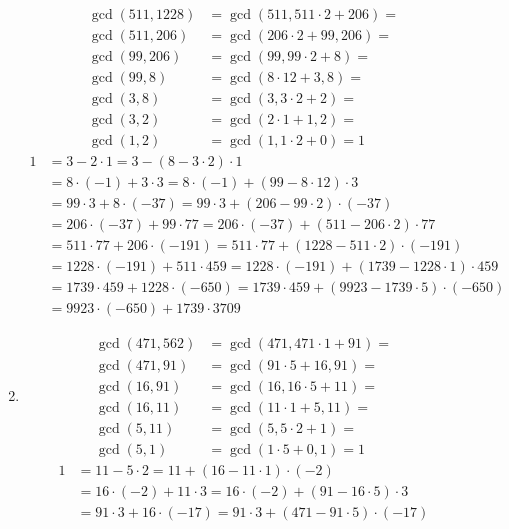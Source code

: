 \begin{description}
\begin{enumerate}
\begin{align*}
\gcd(511, 1228) &= \gcd(511, 511 \cdot 2 + 206) = \\
\gcd(511, 206) &= \gcd(206 \cdot 2 + 99, 206) = \\
\gcd(99, 206) &= \gcd(99, 99 \cdot 2 + 8) = \\
\gcd(99, 8) &= \gcd(8 \cdot 12 + 3, 8) = \\
\gcd(3, 8) &= \gcd(3, 3 \cdot 2 + 2) = \\
\gcd(3, 2) &= \gcd(2 \cdot 1 + 1, 2) = \\
\gcd(1, 2) &= \gcd(1, 1 \cdot 2 + 0) = 1
\end{align*}
\begin{align*}
1 &= 3 - 2 \cdot 1 = 3 - (8 - 3 \cdot 2) \cdot 1 \\
  &= 8 \cdot (-1) + 3 \cdot 3 = 8 \cdot (-1) + (99 - 8 \cdot 12) \cdot 3 \\
  &= 99 \cdot 3 + 8 \cdot (-37) = 99 \cdot 3 + (206 - 99 \cdot 2) \cdot (-37)\\
  &= 206 \cdot (-37) + 99 \cdot 77 = 206 \cdot (-37) + (511 - 206 \cdot 2)
     \cdot 77 \\
  &= 511 \cdot 77 + 206 \cdot (- 191) = 511 \cdot 77 + (1228 - 511 \cdot 2)
     \cdot (-191) \\
  &= 1228 \cdot (-191) + 511 \cdot 459 = 1228 \cdot (-191) +
     (1739 - 1228 \cdot 1) \cdot 459 \\
  &= 1739 \cdot 459 + 1228 \cdot (-650) = 1739 \cdot 459 +
     (9923 - 1739 \cdot 5) \cdot (-650) \\
  &= 9923 \cdot (-650) + 1739 \cdot 3709
\end{align*}
\item
\begin{align*}
\gcd(471, 562) &= \gcd(471, 471 \cdot 1 + 91) = \\
\gcd(471, 91)  &= \gcd(91 \cdot 5 + 16, 91) = \\
\gcd(16, 91)   &= \gcd(16, 16 \cdot 5 + 11) = \\
\gcd(16, 11)   &= \gcd(11 \cdot 1 + 5, 11) = \\
\gcd(5, 11)    &= \gcd(5, 5 \cdot 2 + 1) = \\
\gcd(5, 1)     &= \gcd(1 \cdot 5 + 0, 1) = 1
\end{align*}
\begin{align*}
1 &= 11 - 5 \cdot 2 = 11 + (16 - 11 \cdot 1) \cdot (-2) \\
  &= 16 \cdot (-2) + 11 \cdot 3 = 16 \cdot (-2) + (91 - 16 \cdot 5) \cdot 3 \\
  &= 91 \cdot 3 + 16 \cdot (-17) = 91 \cdot 3 + (471 - 91 \cdot 5) \cdot (-17)

\end{align*}
\end{enumerate}
\end{description}
